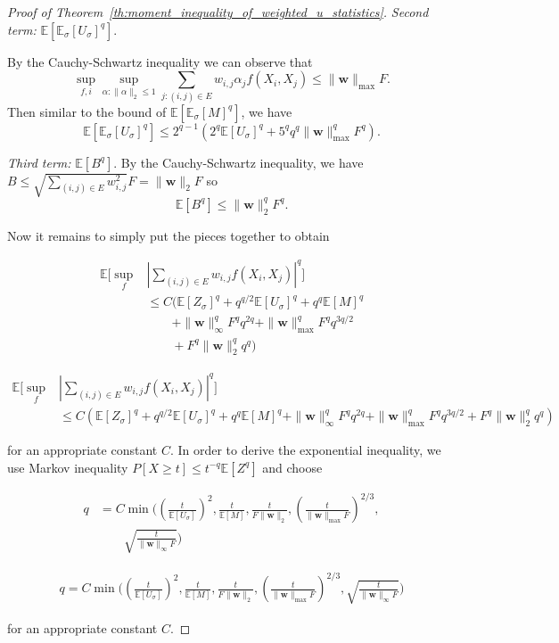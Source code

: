 \documentclass[letterpaper]{article} %
\def\DoubleColumn{}
\def\DoubleColumnEnd{}
\def\SingleColumn{}
\def\SingleColumnEnd{}
\newcommand{\E}{\mathbb{E}}
\newcommand{\Pro}{P}
\newcommand{\weight}{\mathbf{w}}
\newcommand{\rademacher}{\sigma}
\newcommand{\pair}[1]{(#1)}
\begin{document}
\begin{proof}[Proof of Theorem~\ref{th:moment_inequality_of_weighted_u_statistics}]
\textit{Second term:} $\E[\E_\rademacher[U_\rademacher]^q].$

By the Cauchy-Schwartz inequality we can observe that
\[\sup_{f,i}\sup_{\alpha:\|\alpha\|_2\le 1}\sum_{j:\pair{i,j}\in E}w_{i,j}\alpha_jf(X_i,X_j)\le \|\weight{}\|_{\max}F.\]
Then similar to the bound of $\E[\E_\rademacher[M]^q]$, we have
\[\E[\E_\rademacher[U_\rademacher]^q]\le 2^{q-1}(2^q\E[U_\rademacher]^q+5^qq^q\|\weight{}\|_{\max}^qF^q).\]

\textit{Third term:} $\E[B^q]$. By the Cauchy-Schwartz inequality, we have $B\le \sqrt{\sum_{\pair{i,j}\in E}w_{i,j}^2}F= \|\weight{}\|_2F$ so
\[\E[B^q]\le \|\weight{}\|_2^qF^q.\]

Now it remains to simply put the pieces together to obtain
\DoubleColumn
\begin{align*}
\E[\sup_f&|\sum_{\pair{i,j}\in E}w_{i,j} f(X_i,X_j)|^q]\\
&\le C(\E[Z_\rademacher]^q+q^{q/2}\E[U_\rademacher]^q+q^q\E[M]^q\\
&\qquad+\|\weight{}\|_\infty^q F^qq^{2q}+\|\weight{}\|_{\max}^qF^qq^{3q/2}\\
&\qquad+F^q\|\weight{}\|_2^qq^q)
\end{align*}
\DoubleColumnEnd
\SingleColumn
\begin{align*}
\E[\sup_f&|\sum_{\pair{i,j}\in E}w_{i,j} f(X_i,X_j)|^q]\\
&\le C(\E[Z_\rademacher]^q+q^{q/2}\E[U_\rademacher]^q+q^q\E[M]^q+\|\weight{}\|_\infty^q F^qq^{2q}+\|\weight{}\|_{\max}^qF^qq^{3q/2}+F^q\|\weight{}\|_2^qq^q)
\end{align*}
\SingleColumnEnd
for an appropriate constant $C$. 
In order to derive the exponential inequality, we use Markov inequality $\Pro[X\ge t]\le t^{-q}\E[Z^q]$ and choose
\DoubleColumn
\begin{align*}
    q&=C\min\Big((\frac{t}{\E[U_\rademacher]})^2,\frac{t}{\E[M]},\frac{t}{F\|\weight{}\|_2},(\frac{t}{\|\weight{}\|_{\max} F})^{2/3},\\
    &\qquad\sqrt{\frac{t}{\|\weight{}\|_\infty F}}\Big)
\end{align*}
\DoubleColumnEnd
\SingleColumn
\begin{align*}
    q=C\min\Big((\frac{t}{\E[U_\rademacher]})^2,\frac{t}{\E[M]},\frac{t}{F\|\weight{}\|_2},(\frac{t}{\|\weight{}\|_{\max} F})^{2/3},\sqrt{\frac{t}{\|\weight{}\|_\infty F}}\Big)
\end{align*}
\SingleColumnEnd
for an appropriate constant $C$.
\end{proof}
\end{document}
